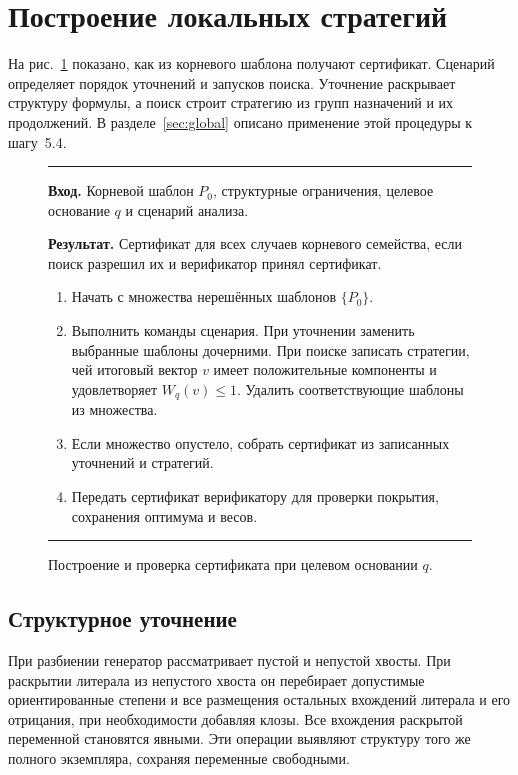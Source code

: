 \documentclass[10pt,twoside]{article}
\theoremstyle{definition}
\theoremstyle{remark}
\begin{document}
\section{Построение локальных стратегий}
\label{sec:automation}
\label{sec:overview}

На рис.~\ref{fig:pipeline} показано, как из корневого шаблона получают
сертификат. Сценарий определяет порядок уточнений и запусков поиска.
Уточнение раскрывает структуру формулы, а поиск строит стратегию из
групп назначений и их продолжений. В разделе~\ref{sec:global} описано
применение этой процедуры к шагу~5.4.

\begin{figure}[!htbp]
\centering
\begin{minipage}{\linewidth}
\small
\hrule\medskip
\noindent\textbf{Вход.} Корневой шаблон $P_0$, структурные ограничения,
целевое основание $q$ и сценарий анализа.

\noindent\textbf{Результат.} Сертификат для всех случаев корневого семейства,
если поиск разрешил их и верификатор принял сертификат.

\begin{enumerate}[leftmargin=*,itemsep=1pt,topsep=3pt]
\item Начать с множества нерешённых шаблонов $\{P_0\}$.
\item Выполнить команды сценария. При уточнении заменить выбранные
шаблоны дочерними. При поиске записать стратегии, чей итоговый вектор $v$
имеет положительные компоненты и удовлетворяет $W_q(v)\le 1$. Удалить
соответствующие шаблоны из множества.
\item Если множество опустело, собрать сертификат из записанных
уточнений и стратегий.
\item Передать сертификат верификатору для проверки покрытия,
сохранения оптимума и весов.
\end{enumerate}
\medskip\hrule
\end{minipage}
\caption{Построение и проверка сертификата при целевом основании $q$.}
\label{fig:pipeline}
\end{figure}

\subsection{Структурное уточнение}

При разбиении генератор рассматривает пустой и непустой хвосты.
При раскрытии литерала из непустого хвоста он
перебирает допустимые ориентированные степени и все размещения остальных
вхождений литерала и его отрицания, при необходимости добавляя клозы.
Все вхождения раскрытой переменной становятся явными. Эти операции
выявляют структуру того же полного экземпляра, сохраняя переменные
свободными.
\end{document}
